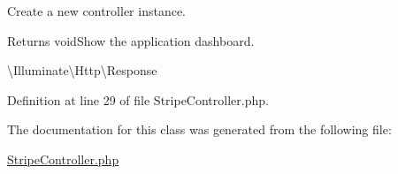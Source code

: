 Create a new controller instance.

\begin{DoxyReturn}{Returns}
void\+Show the application dashboard.

\textbackslash{}\+Illuminate\textbackslash{}\+Http\textbackslash{}\+Response 
\end{DoxyReturn}


Definition at line 29 of file Stripe\+Controller.\+php.



The documentation for this class was generated from the following file\+:\begin{DoxyCompactItemize}
\item 
\mbox{\hyperlink{_stripe_controller_8php}{Stripe\+Controller.\+php}}\end{DoxyCompactItemize}
